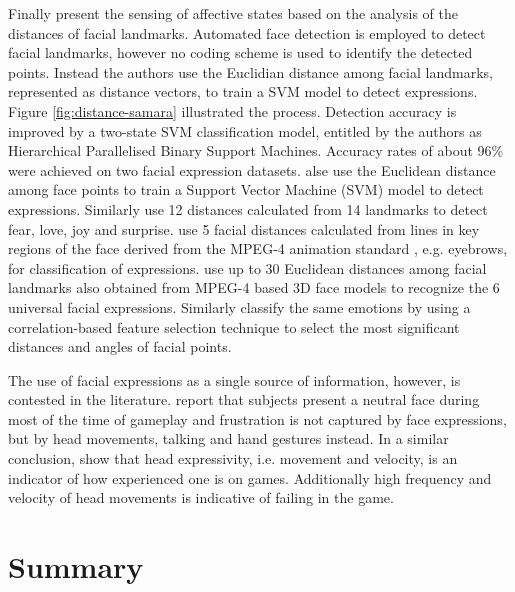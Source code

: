 Finally \textcite{samara2016sensing} present the sensing of affective states based on the analysis of the distances of facial landmarks. Automated face detection is employed to detect facial landmarks, however no coding scheme is used to identify the detected points. Instead the authors use the Euclidian distance among facial landmarks, represented as distance vectors, to train a SVM model to detect expressions. Figure \ref{fig:distance-samara} illustrated the process. Detection accuracy is improved by a two-state SVM classification model, entitled by the authors as Hierarchical Parallelised Binary Support Machines. Accuracy rates of about 96\% were achieved on two facial expression datasets. \textcite{samara2016sensing} alse use the Euclidean distance among face points to train a Support Vector Machine (SVM) model to detect expressions. Similarly \textcite{chang2009emotion} use 12 distances calculated from 14 landmarks to detect fear, love, joy and surprise. \textcite{hammal2007facial} use 5 facial distances calculated from lines in key regions of the face derived from the MPEG-4 animation standard \parencite{abrantes1999mpeg}, e.g. eyebrows, for classification of expressions. \textcite{tang20083d,tang2008line} use up to 30 Euclidean distances among facial landmarks also obtained from MPEG-4 based 3D face models to recognize the 6 universal facial expressions. Similarly \textcite{hupont2013facial} classify the same emotions by using a correlation-based feature selection technique to select the most significant distances and angles of facial points.

The use of facial expressions as a single source of information, however, is contested in the literature. \textcite{blom2014towards} report that subjects present a neutral face during most of the time of gameplay and frustration is not captured by face expressions, but by head movements, talking and hand gestures instead. In a similar conclusion, \textcite{shaker2011game} show that head expressivity, i.e. movement and velocity, is an indicator of how experienced one is on games. Additionally high frequency and velocity of head movements is indicative of failing in the game.

\section{Summary}
\label{sec:literature-face-summary}


